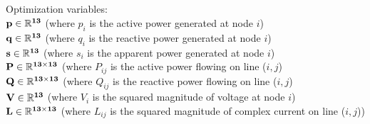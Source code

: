 \documentclass[12pt]{article}
\begin{document}
\subsection{}
Optimization variables:\\
$\bf{p}\in\mathbb{R}^{13}$ (where $p_i$ is the active power generated at node $i$)\\
$\bf{q}\in\mathbb{R}^{13}$ (where $q_i$ is the reactive power generated at node $i$)\\
$\bf{s}\in\mathbb{R}^{13}$ (where $s_i$ is the apparent power generated at node $i$)\\
$\bf{P}\in\mathbb{R}^{13\times13}$ (where $P_{ij}$ is the active power flowing on line ($i,j$)\\
$\bf{Q}\in\mathbb{R}^{13\times13}$ (where $Q_{ij}$ is the reactive power flowing on line ($i,j$)\\
$\bf{V}\in\mathbb{R}^{13}$ (where $V_i$ is the squared magnitude of voltage at node $i$)\\
$\bf{L}\in\mathbb{R}^{13\times13}$ (where $L_{ij}$ is the squared magnitude of complex current on line ($i,j$))
\newpage
\end{document}
